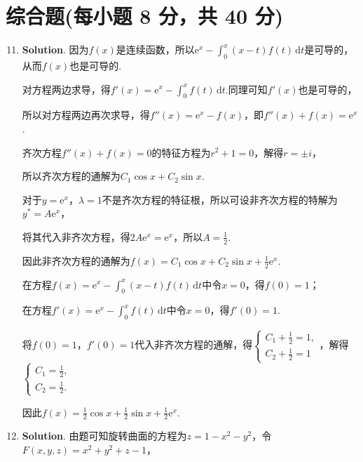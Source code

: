 \documentclass[../Main.tex]{subfiles}
\begin{document}
\section{综合题(每小题 8 分，共 40 分)}
\begin{enumerate}
    \setcounter{enumi}{10}
    \item \textbf{Solution}. 因为$f(x)$是连续函数，所以$\mathrm{e}^{x}-\int_{0}
              ^{x}(x-t)f(t)\,\mathrm{d}t$是可导的，从而$f(x)$也是可导的.

          对方程两边求导，得$f'(x) = \mathrm{e}^{x} - \int_{0}^{x}f(t)\,\mathrm{d}t$.同理可知$f
              '(x)$也是可导的，

          所以对方程两边再次求导，得$f''(x) = \mathrm{e}^{x} - f(x)$，即$f''(x)+f(x) =
              \mathrm{e}^{x}$.

          齐次方程$f''(x)+f(x)=0$的特征方程为$r^{2}+1=0$，解得$r=\pm i$，

          所以齐次方程的通解为$C_{1}\cos x + C_{2}\sin x$.

          对于$y=\mathrm{e}^{x}$，$\lambda = 1$不是齐次方程的特征根，所以可设非齐次方程的特解为$y
                  ^{*} = A\mathrm{e}^{x}$，

          将其代入非齐次方程，得$2A\mathrm{e}^{x} = \mathrm{e}^{x}$，所以$A=\frac{1}{2}$.

          因此非齐次方程的通解为$f(x) = C_{1}\cos x + C_{2}\sin x + \frac{1}{2}\mathrm{e}
              ^{x}$.

          在方程$f(x)=\mathrm{e}^{x}-\int_{0}^{x}(x-t)f(t)\,\mathrm{d}t$中令$x=0$，得$f
              (0)=1$；

          在方程$f'(x) = \mathrm{e}^{x} - \int_{0}^{x}f(t)\,\mathrm{d}t$中令$x=0$，得$f
              '(0)=1$.

          将$f(0)=1$，$f'(0)=1$代入非齐次方程的通解，得$\begin{cases}
                  C_{1} + \frac{1}{2}= 1, \\[6pt]
                  C_{2} + \frac{1}{2}= 1
              \end{cases}$，解得$\begin{cases}
                  C_{1} = \frac{1}{2}, \\[6pt]
                  C_{2} = \frac{1}{2}.
              \end{cases}$

          因此$f(x) = \frac{1}{2}\cos x + \frac{1}{2}\sin x + \frac{1}{2}\mathrm{e}^{x}$.

    \item \textbf{Solution}. 由题可知旋转曲面的方程为$z=1-x^{2}-y^{2}$，令$F
              (x,y,z) = x^{2}+y^{2}+z-1$，


\end{enumerate}
\end{document}

